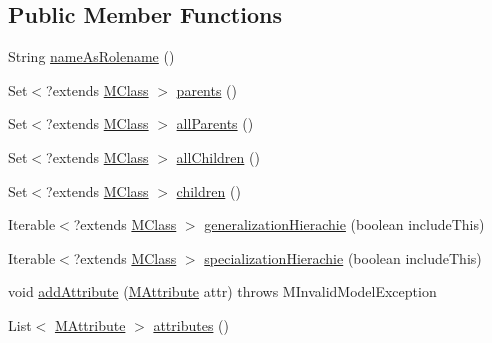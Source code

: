 \subsection*{Public Member Functions}
\begin{DoxyCompactItemize}
\item 
String \hyperlink{interfaceorg_1_1tzi_1_1use_1_1uml_1_1mm_1_1_m_class_a8998e362a6a140ae0b07b6d4c2b20119}{name\-As\-Rolename} ()
\item 
Set$<$?extends \hyperlink{interfaceorg_1_1tzi_1_1use_1_1uml_1_1mm_1_1_m_class}{M\-Class} $>$ \hyperlink{interfaceorg_1_1tzi_1_1use_1_1uml_1_1mm_1_1_m_class_ad2978ef71101c957616af016d21c6ead}{parents} ()
\item 
Set$<$?extends \hyperlink{interfaceorg_1_1tzi_1_1use_1_1uml_1_1mm_1_1_m_class}{M\-Class} $>$ \hyperlink{interfaceorg_1_1tzi_1_1use_1_1uml_1_1mm_1_1_m_class_a3523411acf6f57b6a2da0189c1542c88}{all\-Parents} ()
\item 
Set$<$?extends \hyperlink{interfaceorg_1_1tzi_1_1use_1_1uml_1_1mm_1_1_m_class}{M\-Class} $>$ \hyperlink{interfaceorg_1_1tzi_1_1use_1_1uml_1_1mm_1_1_m_class_a3f9a38ef9b26c6195bdbf6589d994b03}{all\-Children} ()
\item 
Set$<$?extends \hyperlink{interfaceorg_1_1tzi_1_1use_1_1uml_1_1mm_1_1_m_class}{M\-Class} $>$ \hyperlink{interfaceorg_1_1tzi_1_1use_1_1uml_1_1mm_1_1_m_class_afca9f1ff9c0ca23d565c64e8cb5d4861}{children} ()
\item 
Iterable$<$?extends \hyperlink{interfaceorg_1_1tzi_1_1use_1_1uml_1_1mm_1_1_m_class}{M\-Class} $>$ \hyperlink{interfaceorg_1_1tzi_1_1use_1_1uml_1_1mm_1_1_m_class_a3c057032d6182485ccd7528a460cf522}{generalization\-Hierachie} (boolean include\-This)
\item 
Iterable$<$?extends \hyperlink{interfaceorg_1_1tzi_1_1use_1_1uml_1_1mm_1_1_m_class}{M\-Class} $>$ \hyperlink{interfaceorg_1_1tzi_1_1use_1_1uml_1_1mm_1_1_m_class_ad10df6d688b8d97c76e87bc6ef84fc35}{specialization\-Hierachie} (boolean include\-This)
\item 
void \hyperlink{interfaceorg_1_1tzi_1_1use_1_1uml_1_1mm_1_1_m_class_a963bb151e0e690714f424c67a45ec8a1}{add\-Attribute} (\hyperlink{classorg_1_1tzi_1_1use_1_1uml_1_1mm_1_1_m_attribute}{M\-Attribute} attr)  throws M\-Invalid\-Model\-Exception
\item 
List$<$ \hyperlink{classorg_1_1tzi_1_1use_1_1uml_1_1mm_1_1_m_attribute}{M\-Attribute} $>$ \hyperlink{interfaceorg_1_1tzi_1_1use_1_1uml_1_1mm_1_1_m_class_a29e34a6c13555c55a49699c0872ab102}{attributes} ()
\item 

\end{DoxyCompactItemize}
